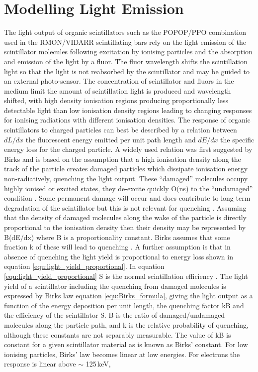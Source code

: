 \section{Modelling Light Emission}\label{sec:GEANT4Simulation_ModellingLightEmission}
The light output of organic scintillators such as the POPOP/PPO combination used in the RMON/VIDARR scintillating bars rely on the light emission of the scintillator molecules following excitation by ionising particles and the absorption and emission of the light by a fluor. The fluor wavelength shifts the scintillation light so that the light is not reabsorbed by the scintillator and may be guided to an external photo-sensor. The concentration of scintillator and fluors in the medium limit the amount of scintillation light is produced and wavelength shifted, with high density ionisation regions producing proportionally less detectable light than low ionisation density regions leading to changing responses for ionising radiations with different ionisation densities. The response of organic scintillators to charged particles can best be described by a relation between $dL/dx$ the fluorescent energy emitted per unit path length and $dE/dx$ the specific energy loss for the charged particle. A widely used relation was first suggested by Birks \cite{birks_1964} and is based on the assumption that a high ionisation density along the track of the particle creates damaged particles which dissipate ionisation energy non-radiatively, quenching the light output. These “damaged” molecules occupy highly ionised or excited states, they de-excite quickly O(ns) to the “undamaged” condition \cite{knoll_2010}. Some permanent damage will occur and does contribute to long term degradation of the scintillator but this is not relevant for quenching \cite{knoll_2010}. Assuming that the density of damaged molecules along the wake of the particle is directly proportional to the ionisation density then their density may be represented by B(dE/dx) where B is a proportionality constant. Birks assumes that some fraction k of these will lead to quenching \cite{craun_1970}. A further assumption is that in absence of quenching the light yield is proportional to energy loss shown in equation \ref{equ:light_yield_proportional}. In equation \ref{equ:light_yield_proportional} S is the normal scintillation efficiency \cite{birks_1964}. The light yield of a scintillator including the quenching from damaged molecules is expressed by Birks law equation \ref{equ:Birks_formula}, giving the light output as a function of the energy deposition per unit length, the quenching factor kB and the efficiency of the scintillator S. B is the ratio of damaged/undamaged molecules along the particle path, and k is the relative probability of quenching, although these constants are not separably measurable. The value of kB is constant for a given scintillator material as is known as Birks' constant. For low ionising particles, Birks' law becomes linear at low energies. For electrons the response is linear above $\sim$ 125\,keV, 